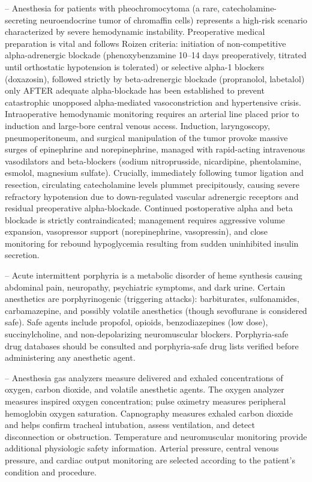 -- Anesthesia for patients with pheochromocytoma (a rare, catecholamine-secreting neuroendocrine tumor of chromaffin cells) represents a high-risk scenario characterized by severe hemodynamic instability. Preoperative medical preparation is vital and follows Roizen criteria: initiation of non-competitive alpha-adrenergic blockade (phenoxybenzamine 10--14 days preoperatively, titrated until orthostatic hypotension is tolerated) or selective alpha-1 blockers (doxazosin), followed strictly by beta-adrenergic blockade (propranolol, labetalol) only AFTER adequate alpha-blockade has been established to prevent catastrophic unopposed alpha-mediated vasoconstriction and hypertensive crisis. Intraoperative hemodynamic monitoring requires an arterial line placed prior to induction and large-bore central venous access. Induction, laryngoscopy, pneumoperitoneum, and surgical manipulation of the tumor provoke massive surges of epinephrine and norepinephrine, managed with rapid-acting intravenous vasodilators and beta-blockers (sodium nitroprusside, nicardipine, phentolamine, esmolol, magnesium sulfate). Crucially, immediately following tumor ligation and resection, circulating catecholamine levels plummet precipitously, causing severe refractory hypotension due to down-regulated vascular adrenergic receptors and residual preoperative alpha-blockade. Continued postoperative alpha and beta blockade is strictly contraindicated; management requires aggressive volume expansion, vasopressor support (norepinephrine, vasopressin), and close monitoring for rebound hypoglycemia resulting from sudden uninhibited insulin secretion.

-- Acute intermittent porphyria is a metabolic disorder of heme synthesis causing abdominal pain, neuropathy, psychiatric symptoms, and dark urine. Certain anesthetics are porphyrinogenic (triggering attacks): barbiturates, sulfonamides, carbamazepine, and possibly volatile anesthetics (though sevoflurane is considered safe). Safe agents include propofol, opioids, benzodiazepines (low dose), succinylcholine, and non-depolarizing neuromuscular blockers. Porphyria-safe drug databases should be consulted and porphyria-safe drug lists verified before administering any anesthetic agent.

-- Anesthesia gas analyzers measure delivered and exhaled concentrations of oxygen, carbon dioxide, and volatile anesthetic agents. The oxygen analyzer measures inspired oxygen concentration; pulse oximetry measures peripheral hemoglobin oxygen saturation. Capnography measures exhaled carbon dioxide and helps confirm tracheal intubation, assess ventilation, and detect disconnection or obstruction. Temperature and neuromuscular monitoring provide additional physiologic safety information. Arterial pressure, central venous pressure, and cardiac output monitoring are selected according to the patient's condition and procedure.

